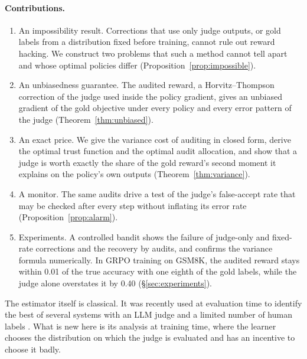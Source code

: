 \paragraph{Contributions.}
\begin{enumerate}
  \item An impossibility result. Corrections that use only judge outputs, or gold labels from a distribution fixed before training, cannot rule out reward hacking. We construct two problems that such a method cannot tell apart and whose optimal policies differ (Proposition~\ref{prop:impossible}).
  \item An unbiasedness guarantee. The audited reward, a Horvitz--Thompson correction \citep{horvitz1952} of the judge used inside the policy gradient, gives an unbiased gradient of the gold objective under every policy and every error pattern of the judge (Theorem~\ref{thm:unbiased}).
  \item An exact price. We give the variance cost of auditing in closed form, derive the optimal trust function and the optimal audit allocation, and show that a judge is worth exactly the share of the gold reward's second moment it explains on the policy's own outputs (Theorem~\ref{thm:variance}).
  \item A monitor. The same audits drive a test of the judge's false-accept rate that may be checked after every step without inflating its error rate (Proposition~\ref{prop:alarm}).
  \item Experiments. A controlled bandit shows the failure of judge-only and fixed-rate corrections and the recovery by audits, and confirms the variance formula numerically. In GRPO training on GSM8K, the audited reward stays within 0.01 of the true accuracy with one eighth of the gold labels, while the judge alone overstates it by 0.40 (\S\ref{sec:experiments}).
\end{enumerate}

The estimator itself is classical. It was recently used at evaluation time to identify the best of several systems with an LLM judge and a limited number of human labels \citep{ao2026bestarm}. What is new here is its analysis at training time, where the learner chooses the distribution on which the judge is evaluated and has an incentive to choose it badly.

